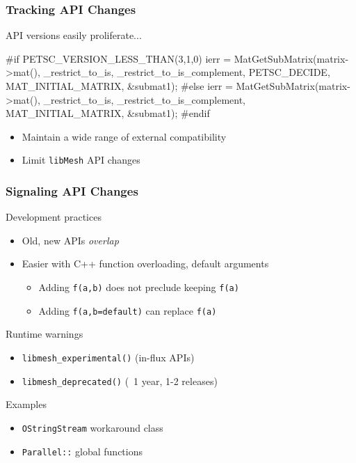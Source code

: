 \documentclass[mathserif]{beamer}
\newcommand{\libMesh}{\texttt{libMesh}\xspace}
\begin{document}
\begin{frame}[fragile]
\frametitle{Tracking API Changes}

\begin{block}{API versions easily proliferate...}
\small
\begin{semiverbatim}
#if PETSC_VERSION_LESS_THAN(3,1,0)
  ierr = MatGetSubMatrix(matrix->mat(),
           _restrict_to_is, _restrict_to_is_complement,
           \alert{PETSC_DECIDE}, MAT_INITIAL_MATRIX, &submat1);
#else
  ierr = MatGetSubMatrix(matrix->mat(),
           _restrict_to_is, _restrict_to_is_complement,
           MAT_INITIAL_MATRIX, &submat1);
#endif
\end{semiverbatim}
\end{block}

\begin{itemize}
	\item Maintain a wide range of external compatibility
	\item Limit \libMesh{} API changes
\end{itemize}

\end{frame}

\begin{frame}
\frametitle{Signaling API Changes}
\begin{block}{Development practices}
\begin{itemize}
	\item Old, new APIs {\emph{overlap}}
	\item Easier with C++ function overloading, default arguments
	\begin{itemize}
		\item Adding \texttt{f(a,b)} does not preclude keeping
			\texttt{f(a)}
		\item Adding \texttt{f(a,b=default)} can replace
			\texttt{f(a)}
	\end{itemize}
\end{itemize}
\end{block}

\begin{block}{Runtime warnings}
\begin{itemize}
	\item {\texttt{libmesh\_experimental()}} \quad (in-flux APIs)
	\item {\texttt{libmesh\_deprecated()}} \quad (~1 year, 1-2 releases)
\end{itemize}
\end{block}

\begin{block}{Examples}
\begin{itemize}
	\item {\texttt{OStringStream} workaround class}
	\item {\texttt{Parallel::} global functions}
\end{itemize}
\end{block}


\end{frame}
\end{document}
